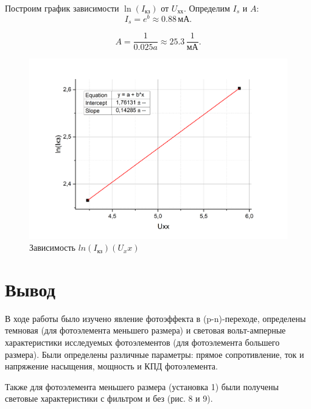 \documentclass[a4paper,12pt]{article} %
\begin{document}
Построим график зависимости $\ln(I_{\text{кз}})$ от $U_{\text{хх}}$. Определим $I_s$ и $A$:
\[
I_s = e^b \approx 0.88 \, \text{мА}. \tag{10}
\]

\[
A = \frac{1}{0.025a} \approx 25.3 \, \frac{1}{\text{мА}}.
\]

\begin{figure}[h!]
    \centering
    \includegraphics[scale=0.35]{прямая из двух точек.png}
    \caption{Зависимость $ln(I_\text{кз})(U_xx)$}
\end{figure}

\newpage

\section{Вывод}
В ходе работы было изучено явление фотоэффекта в (p-n)-переходе, определены темновая (для фотоэлемента меньшего размера) и световая вольт-амперные характеристики исследуемых фотоэлементов (для фотоэлемента большего размера). Были определены различные параметры: прямое сопротивление, ток и напряжение насыщения, мощность и КПД фотоэлемента.   

Также для фотоэлемента меньшего размера (установка 1) были получены световые характеристики с фильтром и без (рис. 8 и 9).
\end{document}
